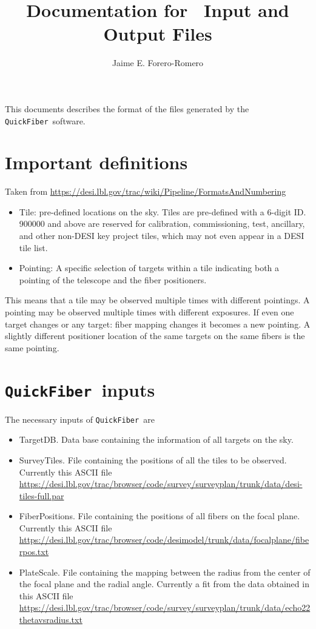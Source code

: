\documentclass{article}
\title{Documentation for \code\ Input and Output Files}
\author{Jaime E. Forero-Romero}
\newcommand{\code}{{\texttt{QuickFiber}}}
\begin{document}
\maketitle
\tableofcontents 

\vspace{1cm}
This documents describes the format of the files generated by the
\code\ software.  

\section{Important definitions}
Taken from \url{https://desi.lbl.gov/trac/wiki/Pipeline/FormatsAndNumbering}
\begin{itemize}

  \item Tile: pre-defined locations on the sky. Tiles are pre-defined
    with a 6-digit ID. 900000 and above are reserved for calibration,
    commissioning, test, ancillary, and other non-DESI key project
    tiles, which may not even appear in a DESI tile list.  
  \item Pointing: A specific
    selection of targets within a tile indicating both a pointing of the
    telescope and the fiber positioners.  
\end{itemize}

This means that a tile may be observed
multiple times with different pointings. A pointing may be observed
multiple times with different exposures. If even one target changes
or any target: fiber mapping changes it becomes a new pointing. A
slightly different positioner location of the same targets on the
same fibers is the same pointing.  

\section{\code\ inputs}
The necessary inputs of \code\ are 
\begin{itemize}
\item TargetDB. Data base containing the information of all targets on the sky. 
\item SurveyTiles. File containing the positions of all the tiles to
  be observed. 
Currently this ASCII file\\
  \url{https://desi.lbl.gov/trac/browser/code/survey/surveyplan/trunk/data/desi-tiles-full.par}  
\item FiberPositions. File containing the positions of all fibers on
  the focal plane.  
Currently this ASCII file\\
  \url{https://desi.lbl.gov/trac/browser/code/desimodel/trunk/data/focalplane/fiberpos.txt} 
\item PlateScale. File containing the mapping between the radius from
  the center of the focal plane and the radial angle.
  Currently a fit from the data obtained in this ASCII file\\
  \url{https://desi.lbl.gov/trac/browser/code/survey/surveyplan/trunk/data/echo22thetavsradius.txt}
\end{itemize}
\end{document}
